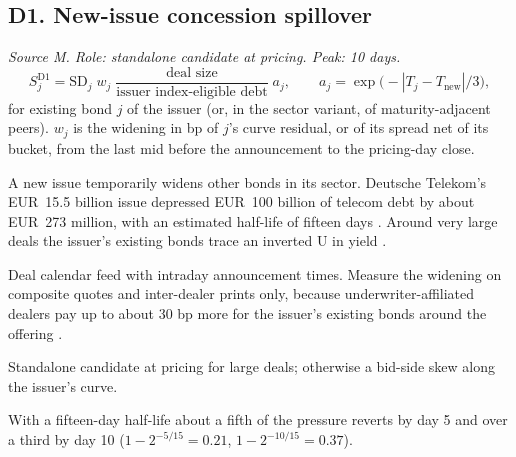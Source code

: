 \documentclass[11pt,letterpaper]{article}
\newcommand{\SD}{\mathrm{SD}}             %
\begin{document}
\subsection{D1. New-issue concession spillover}
\emph{Source M. Role: standalone candidate at pricing. Peak: 10 days.}
\begin{equation}
S^{\mathrm{D1}}_{j}=\SD_j\;w_j\;\frac{\text{deal size}}{\text{issuer index-eligible debt}}\;a_j,\qquad a_j=\exp\!\bigl(-|T_j-T_{\mathrm{new}}|/3\bigr),
\end{equation}
for existing bond $j$ of the issuer (or, in the sector variant, of maturity-adjacent peers). $w_j$ is the widening in bp of $j$'s curve residual, or of its spread net of its bucket, from the last mid before the announcement to the pricing-day close.
\begin{spec}
\item[Mechanism and evidence.] A new issue temporarily widens other bonds in its sector. Deutsche Telekom's EUR~15.5 billion issue depressed EUR~100 billion of telecom debt by about EUR~273 million, with an estimated half-life of fifteen days \cite{nr2004}. Around very large deals the issuer's existing bonds trace an inverted U in yield \cite{hw2021}.
\item[Build.] Deal calendar feed with intraday announcement times. Measure the widening on composite quotes and inter-dealer prints only, because underwriter-affiliated dealers pay up to about 30 bp more for the issuer's existing bonds around the offering \cite{tricks}.
\item[Role in the quote.] Standalone candidate at pricing for large deals; otherwise a bid-side skew along the issuer's curve.
\item[Decay and pitfalls.] With a fifteen-day half-life about a fifth of the pressure reverts by day 5 and over a third by day 10 ($1-2^{-5/15}=0.21$, $1-2^{-10/15}=0.37$).
\end{spec}
\end{document}
